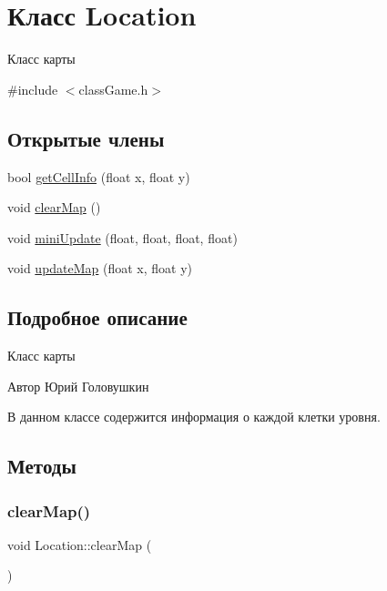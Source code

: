 \hypertarget{classLocation}{}\section{Класс Location}
\label{classLocation}


Класс карты  




{\ttfamily \#include $<$class\+Game.\+h$>$}

\subsection*{Открытые члены}
\begin{DoxyCompactItemize}
\item 
bool \hyperlink{classLocation_a611533b2c207b0f16de0028e8273bd89}{get\+Cell\+Info} (float x, float y)
\item 
void \hyperlink{classLocation_a1ab603fce48cd7d27928c8c554346be7}{clear\+Map} ()
\item 
void \hyperlink{classLocation_a65590636116960abb1799763f011dede}{mini\+Update} (float, float, float, float)
\item 
void \hyperlink{classLocation_a05673358cad329e92cb189f8ec493aad}{update\+Map} (float x, float y)
\end{DoxyCompactItemize}


\subsection{Подробное описание}
Класс карты 

\begin{DoxyAuthor}{Автор}
Юрий Головушкин
\end{DoxyAuthor}
В данном классе содержится информация о каждой клетки уровня. 

\subsection{Методы}
\mbox{\label{classLocation_a1ab603fce48cd7d27928c8c554346be7}} 
\subsubsection{\texorpdfstring{clear\+Map()}{clearMap()}}
{\footnotesize\ttfamily void Location\+::clear\+Map (\begin{DoxyParamCaption}{ }\end{DoxyParamCaption})}

